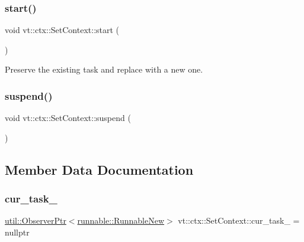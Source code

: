 \subsubsection{\texorpdfstring{start()}{start()}}
{\footnotesize\ttfamily void vt\+::ctx\+::\+Set\+Context\+::start (\begin{DoxyParamCaption}{ }\end{DoxyParamCaption})}



Preserve the existing task and replace with a new one. 

\mbox{\label{structvt_1_1ctx_1_1_set_context_aabc5e6b4061b15b07c42a0ec8108f829}} 
\subsubsection{\texorpdfstring{suspend()}{suspend()}}
{\footnotesize\ttfamily void vt\+::ctx\+::\+Set\+Context\+::suspend (\begin{DoxyParamCaption}{ }\end{DoxyParamCaption})}



\subsection{Member Data Documentation}
\mbox{\label{structvt_1_1ctx_1_1_set_context_a54caa513b9c676ccbd100f701f10ba81}} 
\subsubsection{\texorpdfstring{cur\+\_\+task\+\_\+}{cur\_task\_}}
{\footnotesize\ttfamily \hyperlink{namespacevt_1_1util_a7d480434049896696b9a50c38a766202}{util\+::\+Observer\+Ptr}$<$\hyperlink{structvt_1_1runnable_1_1_runnable_new}{runnable\+::\+Runnable\+New}$>$ vt\+::ctx\+::\+Set\+Context\+::cur\+\_\+task\+\_\+ = nullptr\hspace{0.3cm}{\ttfamily [private]}}



